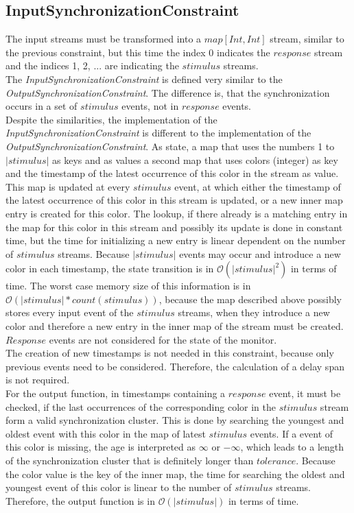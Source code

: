 \subsection{InputSynchronizationConstraint}
	The input streams must be transformed into a $map[Int, Int]$ stream, similar to the previous constraint, but this time the index 0 indicates the $response$ stream and the indices 1, 2, ... are indicating the $stimulus$ streams.\\
	The \emph{InputSynchronizationConstraint} is defined very similar to the \emph{OutputSynchronizationConstraint}. The difference is, that the synchronization occurs in a set of $stimulus$ events, not in $response$ events.\\
	Despite the similarities, the implementation of the \emph{InputSynchronizationConstraint}  is different to the implementation of the \emph{OutputSynchronizationConstraint}. As state, a map that uses the numbers 1 to $|stimulus|$ as keys and as values a second map that uses colors (integer) as key and the timestamp of the latest occurrence of this color in the stream as value. This map is updated at every $stimulus$ event, at which either the timestamp of the latest occurrence of this color in this stream is updated, or a new inner map entry is created for this color.  The lookup, if there already is a matching entry in the map for this color in this stream and possibly its update is done in constant time, but the time for initializing a new entry is linear dependent on the number of $stimulus$ streams. Because $|stimulus|$ events may occur and introduce a new color in each timestamp, the state transition is in $\mathcal{O}(|stimulus|^2)$ in terms of time. The worst case memory size of this information is in $\mathcal{O}(|stimulus|*count(stimulus))$, because the map described above possibly stores every input event of the $stimulus$ streams, when they introduce a new color and therefore a new entry in the inner map of the stream must be created. $Response$ events are not considered for the state of the monitor.\\
	The creation of new timestamps is not needed in this constraint, because only previous events need to be considered. Therefore, the calculation of a delay span is not required.\\
	For the output function, in timestamps containing a $response$ event, it must be checked, if the last occurrences of the corresponding color in the $stimulus$ stream form a valid synchronization cluster. This is done by searching the youngest and oldest event with this color in the map of latest $stimulus$ events. If a event of this color is missing, the age is interpreted as $\infty$ or $-\infty$, which leads to a length of the synchronization cluster that is definitely longer than $tolerance$. Because the color value is the key of the inner map, the time for searching the oldest and youngest event of this color is linear to the number of $stimulus$ streams. Therefore, the output function is in $\mathcal{O}(|stimulus|)$ in terms of time.
	
